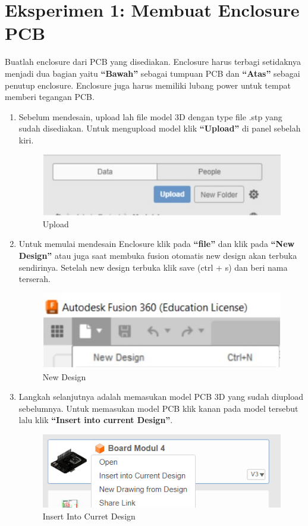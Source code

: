\section{Eksperimen 1: Membuat Enclosure PCB}
Buatlah enclosure dari PCB yang disediakan. Enclosure harus terbagi setidaknya menjadi dua bagian yaitu
\textbf{“Bawah”} sebagai tumpuan PCB dan \textbf{“Atas”} sebagai penutup enclosure. Enclosure juga harus memiliki
lubang power untuk tempat memberi tegangan PCB.
\begin{enumerate}
    \item Sebelum mendesain, upload lah file model 3D dengan type file .stp yang sudah disediakan. Untuk
    mengupload model klik \textbf{“Upload”} di panel sebelah kiri.
        \begin{figure}[H]
            \centering
            \includegraphics[width=0.5\linewidth]{P3/img/image3.jpg}
            \caption{Upload}
            \label{fig:Upload}
        \end{figure}

    \item Untuk memulai mendesain Enclosure klik pada \textbf{“file”} dan klik pada \textbf{“New Design”} atau juga saat
    membuka fusion otomatis new design akan terbuka sendirinya. Setelah new design terbuka klik
    save (ctrl + s) dan beri nama terserah.
        \begin{figure}[H]
            \centering
            \includegraphics[width=0.5\linewidth]{P3/img/image4.jpg}
            \caption{New Design}
            \label{fig:New Design}
        \end{figure}

    \item Langkah selanjutnya adalah memasukan model PCB 3D yang sudah diupload sebelumnya. Untuk
    memasukan model PCB klik kanan pada model tersebut lalu klik \textbf{“Insert into current Design”}.
        \begin{figure}[H]
            \centering
            \includegraphics[width=0.5\linewidth]{P3/img/Insert to Current Design.png}
            \caption{Insert Into Curret Design}
            \label{fig:Insert Into Curret Design}
        \end{figure}


\end{enumerate}
